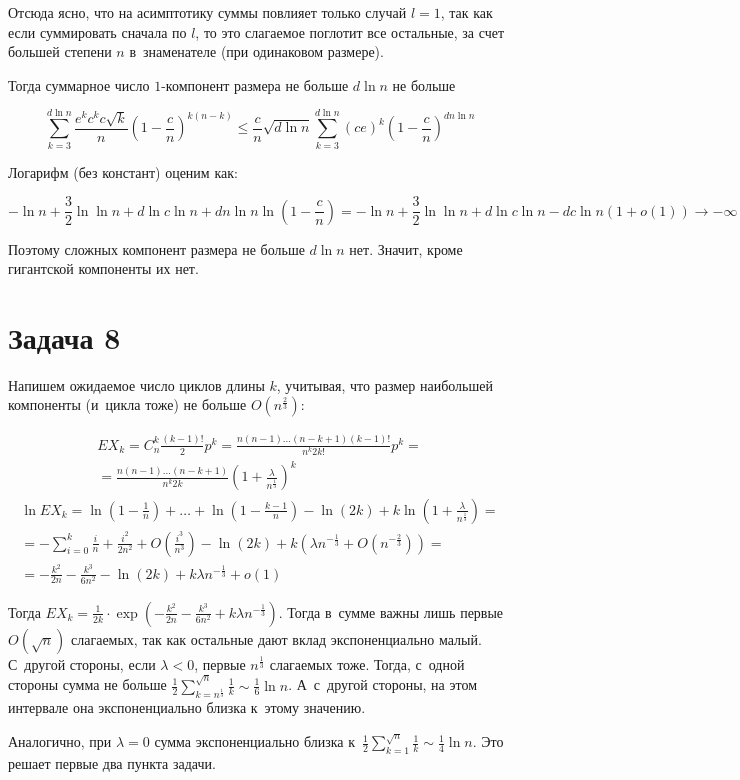 \documentclass{article}
\theoremstyle{definition}
\theoremstyle{remark}
\renewcommand{\le}{\leqslant}
\begin{document}
Отсюда ясно, что на асимптотику суммы повлияет только случай $l = 1$, так как если суммировать
сначала по $l$, то это слагаемое поглотит все остальные, за счет большей степени $n$
в~знаменателе (при одинаковом размере).

Тогда суммарное число $1$-компонент размера не больше $d \ln n$ не больше

\begin{equation*}
	\sum_{k=3}^{d\ln n} \frac{e^k c^{k} c \sqrt{k}}{n} \left(1 - \frac{c}{n}\right)^{k(n-k)} \le
	\frac{c}{n} \sqrt{d \ln n} \sum\limits_{k=3}^{d\ln n} (ce)^k \left(1 - \frac{c}{n}\right)^{dn\ln
	n}
\end{equation*}

Логарифм (без констант) оценим как:

\begin{equation*}
	-\ln n + \frac{3}{2} \ln \ln n + d \ln c \ln n + dn \ln n \ln\left(1 - \frac{c}{n}\right) = -\ln n
	+ \frac{3}{2} \ln \ln n + d\ln c \ln n - dc\ln n (1 + o(1)) \rightarrow -\infty
\end{equation*}

Поэтому сложных компонент размера не больше $d \ln n$ нет. Значит, кроме гигантской компоненты их
нет.

\section*{Задача 8}

Напишем ожидаемое число циклов длины $k$, учитывая, что размер наибольшей компоненты (и~цикла тоже) 
не больше $O(n^\frac{2}{3})$:

\begin{multline*}
	EX_k = C_n^k \frac{(k-1)!}{2}p^k = \frac{n(n-1)\ldots(n-k+1) (k-1)!}{n^k 2k!} p^k =\\
	= \frac{n(n-1)\ldots(n-k+1)}{n^k 2k} \left(1 + \frac{\lambda}{n^\frac{1}{3}}\right)^k
\end{multline*}
\begin{multline*}
	\ln EX_k = \ln \left(1-\frac{1}{n}\right) + \ldots + \ln \left(1 - \frac{k-1}{n}\right) - \ln(2k)
	+ k\ln\left(1 + \frac{\lambda}{n^\frac{1}{3}}\right) =\\
	= -\sum_{i=0}^{k} \frac{i}{n} + \frac{i^2}{2n^2} + O\left(
	\frac{i^3}{n^3}\right) - \ln(2k) + k(\lambda n^{-\frac{1}{3}} + O(n^{-\frac{2}{3}})) =\\
	= -\frac{k^2}{2n} -\frac{k^3}{6n^2} -\ln(2k) + k\lambda n^{-\frac{1}{3}} + o(1)
\end{multline*}

Тогда $EX_k = \frac{1}{2k} \cdot \exp(-\frac{k^2}{2n} -\frac{k^3}{6n^2} + k\lambda
n^{-\frac{1}{3}})$. Тогда в~сумме важны лишь первые $O(\sqrt{n})$ слагаемых, так как остальные дают
вклад экспоненциально малый. С~другой стороны, если $\lambda < 0$, первые $n^\frac{1}{3}$ слагаемых
тоже. Тогда, с~одной стороны сумма не больше $\frac{1}{2} \sum\limits_{k=n^\frac{1}{3}}^{\sqrt{n}}
\frac{1}{k} \sim \frac{1}{6} \ln n$. А~с~другой стороны, на этом интервале она экспоненциально
близка к~этому значению.

Аналогично, при $\lambda = 0$ сумма экспоненциально близка к~$\frac{1}{2}
\sum\limits_{k=1}^{\sqrt{n}} \frac{1}{k} \sim \frac{1}{4} \ln n$. Это решает первые два пункта
задачи.
\end{document}
